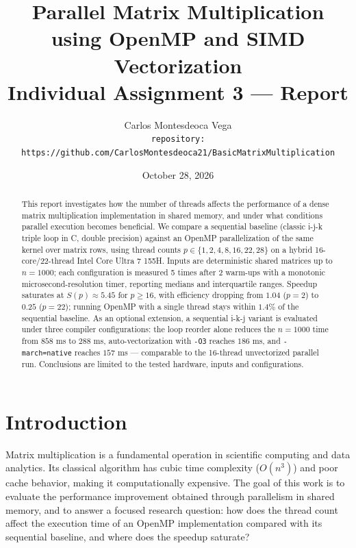\documentclass[12pt,a4paper]{article}
\begin{document}
\title{\LARGE Parallel Matrix Multiplication using OpenMP and SIMD
Vectorization\\[0.5em]
\normalsize\normalfont Individual Assignment 3 --- Report}
\author{Carlos Montesdeoca Vega\\[8pt]
\texttt{repository:}\\[2pt]
\small\texttt{https://github.com/CarlosMontesdeoca21/BasicMatrixMultiplication}}
\date{October 28, 2026}

\maketitle

\begin{abstract}
This report investigates how the number of threads affects the performance of
a dense matrix multiplication implementation in shared memory, and under what
conditions parallel execution becomes beneficial. We compare a sequential
baseline (classic i-j-k triple loop in C, double precision) against an OpenMP
parallelization of the same kernel over matrix rows, using thread counts
$p \in \{1, 2, 4, 8, 16, 22, 28\}$ on a hybrid 16-core/22-thread Intel Core
Ultra 7 155H. Inputs are deterministic shared matrices up to $n = 1000$;
each configuration is measured 5 times after 2 warm-ups with a
monotonic microsecond-resolution timer, reporting medians and interquartile
ranges. Speedup saturates at $S(p) \approx 5.45$ for $p \geq 16$, with
efficiency dropping from $1.04$ ($p=2$) to $0.25$ ($p=22$); running OpenMP
with a single thread stays within $1.4\%$ of the sequential baseline. As an
optional extension, a sequential i-k-j variant is evaluated under three
compiler configurations: the loop reorder alone reduces the $n=1000$ time
from $858$ ms to $288$ ms, auto-vectorization with \texttt{-O3} reaches
$186$ ms, and \texttt{-march=native} reaches $157$ ms --- comparable to the
16-thread unvectorized parallel run. Conclusions are limited to the tested
hardware, inputs and configurations.
\end{abstract}

\section{Introduction}
\label{sec:intro}

Matrix multiplication is a fundamental operation in scientific computing and
data analytics. Its classical algorithm has cubic time complexity
($O(n^3)$) and poor cache behavior, making it computationally expensive.
The goal of this work is to evaluate the performance improvement obtained
through parallelism in shared memory, and to answer a focused research
question: how does the thread count affect the execution time of an OpenMP
implementation compared with its sequential baseline, and where does the
speedup saturate?
\end{document}
